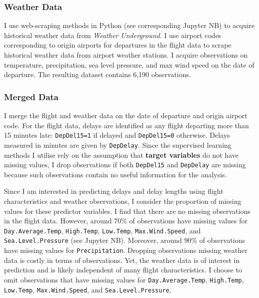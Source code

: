 \documentclass[
]{article}
\begin{document}
\subsubsection{Weather Data}

I use web-scraping methods in Python (see corresponding Jupyter NB) to
acquire historical weather data from \textit{Weather Underground}. I use
airport codes corresponding to origin airports for departures in the
flight data to scrape historical weather data from airport weather
stations. I acquire observations on temperature, precipitation, sea
level pressure, and max wind speed on the date of departure. The
resulting dataset contains 6,190 observations.

\subsubsection{Merged Data}

I merge the flight and weather data on the date of departure and origin
airport code. For the flight data, delays are identified as any flight
departing more than 15 minutes late: \texttt{DepDel15=1} if delayed and
\texttt{DepDel15=0} otherwise. Delays measured in minutes are given by
\texttt{DepDelay}. Since the supervised learning methods I utilise rely
on the assumption that \textbf{target variables} do not have missing
values, I drop observations if both \texttt{DepDel15} and
\texttt{DepDelay} are missing because such observations contain no
useful information for the analysis.

Since I am interested in predicting delays and delay lengths using
flight characteristics and weather observations, I consider the
proportion of missing values for these predictor variables. I find that
there are no missing observations in the flight data. However, around
70\% of observations have missing values for \texttt{Day.Average.Temp},
\texttt{High.Temp}, \texttt{Low.Temp}, \texttt{Max.Wind.Speed}, and
\texttt{Sea.Level.Pressure} (see Jupyter NB). Moreover, around 90\% of
observations have missing values for \texttt{Precipitation}. Dropping
observations missing weather data is costly in terms of observations.
Yet, the weather data is of interest in prediction and is likely
independent of many flight characteristics. I choose to omit
observations that have missing values for \texttt{Day.Average.Temp},
\texttt{High.Temp}, \texttt{Low.Temp}, \texttt{Max.Wind.Speed}, and
\texttt{Sea.Level.Pressure}.\\
\end{document}
